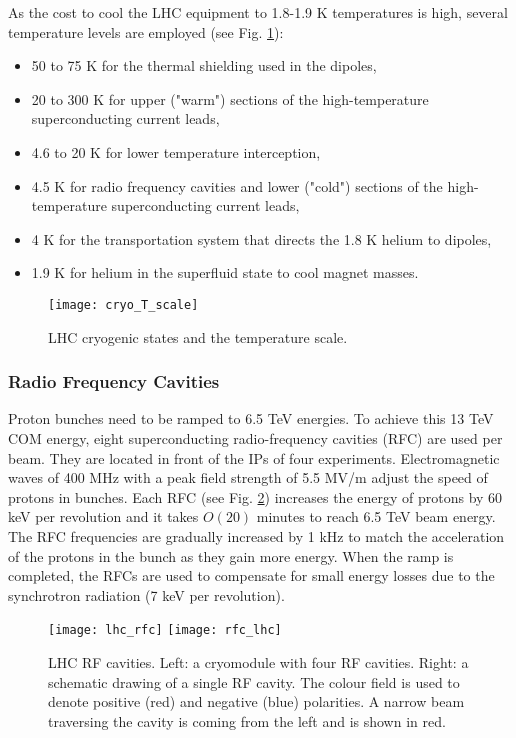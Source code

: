 \begin{normalsize}
As the cost to cool the LHC equipment to 1.8-1.9 K temperatures is high, several temperature levels are employed (see Fig. \ref{cryo_T_scale}):
 
\begin{itemize}
\item 50 to 75 K for the thermal shielding used in the dipoles,
\item 20 to 300 K for upper ("warm") sections of the high-temperature superconducting current leads,
\item 4.6 to 20 K for lower temperature interception,
\item 4.5 K for radio frequency cavities and lower ("cold") sections of the high-temperature superconducting current leads,
\item 4 K for the transportation system that directs the 1.8 K helium to dipoles,
\item 1.9 K for helium in the superfluid state to cool magnet masses.
\end{itemize}

\begin{figure}[H]
  \centering
  \texttt{[image: cryo\_T\_scale]}
  \caption{LHC cryogenic states and the temperature scale.}
  \label{cryo_T_scale}
\end{figure}




\subsubsection{Radio Frequency Cavities}\label{sec:rf}


Proton bunches need to be ramped to 6.5 TeV energies. To achieve this 13 TeV COM energy, eight superconducting radio-frequency cavities (RFC) are used per beam. They are located in front of the IPs of four experiments. Electromagnetic waves of 400 MHz with a peak field strength of 5.5 MV/m adjust the speed of protons in bunches. Each RFC (see Fig. \ref{lhc_rfc}) increases the energy of protons by 60 keV per revolution and it takes $O(20)$ minutes to reach 6.5 TeV beam energy. The RFC frequencies are gradually increased by 1 kHz to match the acceleration of the protons in the bunch as they gain more energy. When the ramp is completed, the RFCs are used to compensate for small energy losses due to the synchrotron radiation (7 keV per revolution). 



\begin{figure}[H]
\centering
\texttt{[image: lhc\_rfc]}
\texttt{[image: rfc\_lhc]}
\caption[RF cavities module.]{LHC RF cavities. Left: a cryomodule with four RF cavities. Right: a schematic drawing of a single RF cavity. The colour field is used to denote positive (red) and negative (blue) polarities. A narrow beam traversing the cavity is coming from the left and is shown in red. }
\label{lhc_rfc}
\end{figure}



\end{normalsize}
